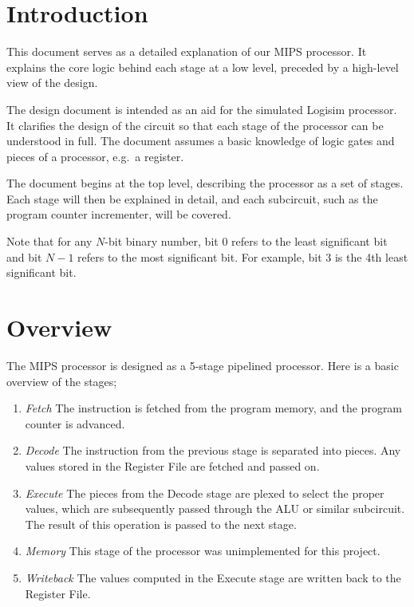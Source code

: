 \section{Introduction}\label{introduction}

This document serves as a detailed explanation of our MIPS processor. It
explains the core logic behind each stage at a low level, preceded by a
high-level view of the design.

The design document is intended as an aid for the simulated Logisim
processor. It clarifies the design of the circuit so that each stage of
the processor can be understood in full. The document assumes a basic
knowledge of logic gates and pieces of a processor, e.g.~a register.

The document begins at the top level, describing the processor as a set
of stages. Each stage will then be explained in detail, and each
subcircuit, such as the program counter incrementer, will be covered.

Note that for any \(N\)-bit binary number, bit 0 refers to the least
significant bit and bit \(N-1\) refers to the most significant bit. For
example, bit 3 is the 4th least significant bit.

\section{Overview}\label{overview}

The MIPS processor is designed as a 5-stage pipelined processor. Here is
a basic overview of the stages;

\begin{enumerate}
\def\labelenumi{\arabic{enumi}.}
\itemsep1pt\parskip0pt
\item
  \emph{Fetch} The instruction is fetched from the program memory, and
  the program counter is advanced.
\item
  \emph{Decode} The instruction from the previous stage is separated
  into pieces. Any values stored in the Register File are fetched and
  passed on.
\item
  \emph{Execute} The pieces from the Decode stage are plexed to select
  the proper values, which are subsequently passed through the ALU or
  similar subcircuit. The result of this operation is passed to the next
  stage.
\item
  \emph{Memory} This stage of the processor was unimplemented for this
  project.
\item
  \emph{Writeback} The values computed in the Execute stage are written
  back to the Register File.
\end{enumerate}

